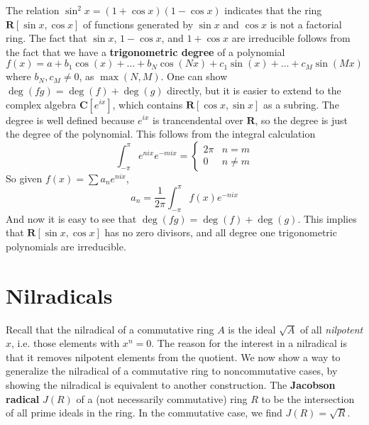 \begin{example}
    The relation $\sin^2 x = (1 + \cos x)(1 - \cos x)$ indicates that the ring $\mathbf{R}[\sin x, \cos x]$ of functions generated by $\sin x$ and $\cos x$ is not a factorial ring. The fact that $\sin x$, $1 - \cos x$, and $1 + \cos x$ are irreducible follows from the fact that we have a {\bf trigonometric degree} of a polynomial
    \[ f(x) = a + b_1 \cos(x) + \dots + b_N \cos(Nx) + c_1 \sin(x) + \dots + c_M \sin(Mx) \]
    where $b_N, c_M \neq 0$, as $\max(N,M)$. One can show $\deg(fg) = \deg(f) + \deg(g)$ directly, but it is easier to extend to the complex algebra $\mathbf{C}[e^{ix}]$, which contains $\mathbf{R}[\cos x, \sin x]$ as a subring. The degree is well defined because $e^{ix}$ is trancendental over $\mathbf{R}$, so the degree is just the degree of the polynomial. This follows from the integral calculation
    \[ \int_{-\pi}^\pi e^{nix} e^{-mix} = \begin{cases} 2\pi & n = m \\ 0 & n \neq m \end{cases} \]
    So given $f(x) = \sum a_n e^{nix}$,
    \[ a_n = \frac{1}{2\pi} \int_{-\pi}^\pi f(x) e^{-nix} \]
    And now it is easy to see that $\deg(fg) = \deg(f) + \deg(g)$. This implies that $\mathbf{R}[\sin x, \cos x]$ has no zero divisors, and all degree one trigonometric polynomials are irreducible.
\end{example}

\section{Nilradicals}

Recall that the nilradical of a commutative ring $A$ is the ideal $\sqrt{A}$ of all {\it nilpotent} $x$, i.e. those elements with $x^n = 0$. The reason for the interest in a nilradical is that it removes nilpotent elements from the quotient. We now show a way to generalize the nilradical of a commutative ring to noncommutative cases, by showing the nilradical is equivalent to another construction. The {\bf Jacobson radical} $J(R)$ of a (not necessarily commutative) ring $R$ to be the intersection of all prime ideals in the ring. In the commutative case, we find $J(R) = \sqrt{R}$.


